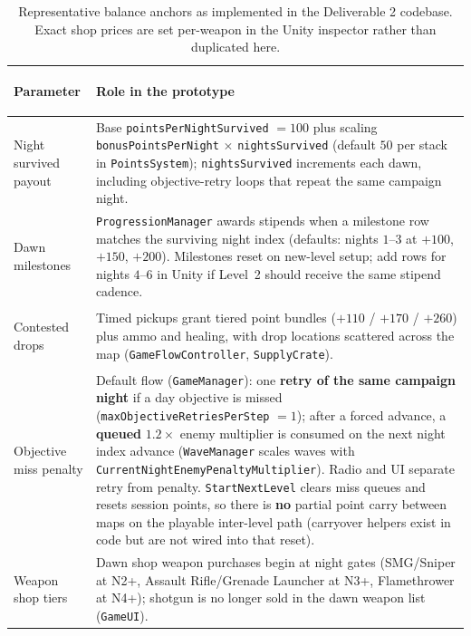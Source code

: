 \documentclass[11pt]{article}
\begin{document}
\begin{table}[H]
    \centering
    \begingroup
    \small
    \renewcommand{\arraystretch}{1.2}
    \setlength{\tabcolsep}{7pt}
    \begin{tabularx}{\textwidth}{>{\bfseries\raggedright\arraybackslash}p{} Y}
        \toprule
        Parameter & Role in the prototype \\
        \midrule
        Night survived payout & Base \texttt{pointsPerNightSurvived} $= 100$ plus scaling \texttt{bonusPointsPerNight} $\times$ \texttt{nightsSurvived} (default $50$ per stack in \texttt{PointsSystem}); \texttt{nightsSurvived} increments each dawn, including objective-retry loops that repeat the same campaign night. \\
        \addlinespace[0.25em]
        Dawn milestones & \texttt{ProgressionManager} awards stipends when a milestone row matches the surviving night index (defaults: nights $1$--$3$ at $+100$, $+150$, $+200$). Milestones reset on new-level setup; add rows for nights $4$--$6$ in Unity if Level~2 should receive the same stipend cadence. \\
        \addlinespace[0.25em]
        Contested drops & Timed pickups grant tiered point bundles ($+110$ / $+170$ / $+260$) plus ammo and healing, with drop locations scattered across the map (\texttt{GameFlowController}, \texttt{SupplyCrate}). \\
        \addlinespace[0.25em]
        Objective miss penalty & Default flow (\texttt{GameManager}): one \textbf{retry of the same campaign night} if a day objective is missed (\texttt{maxObjectiveRetriesPerStep} $= 1$); after a forced advance, a \textbf{queued} $1.2\times$ enemy multiplier is consumed on the next night index advance (\texttt{WaveManager} scales waves with \texttt{CurrentNightEnemyPenaltyMultiplier}). Radio and UI separate retry from penalty. \texttt{StartNextLevel} clears miss queues and resets session points, so there is \textbf{no} partial point carry between maps on the playable inter-level path (carryover helpers exist in code but are not wired into that reset). \\
        \addlinespace[0.25em]
        Weapon shop tiers & Dawn shop weapon purchases begin at night gates (SMG/Sniper at N2+, Assault Rifle/Grenade Launcher at N3+, Flamethrower at N4+); shotgun is no longer sold in the dawn weapon list (\texttt{GameUI}). \\
        \bottomrule
    \end{tabularx}
    \endgroup
    \caption{Representative balance anchors as implemented in the Deliverable 2 codebase. Exact shop prices are set per-weapon in the Unity inspector rather than duplicated here.}
\end{table}
\end{document}
